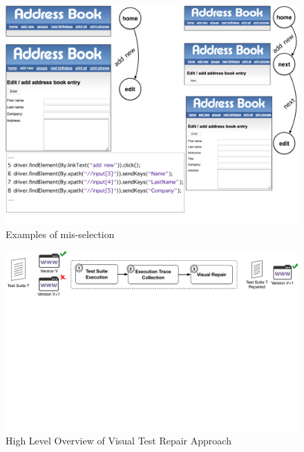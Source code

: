 \begin{figure}[t]
\centering
\includegraphics[trim={0cm 1cm 0cm 0cm},clip,scale=0.23]{images/misselection}
\caption{Examples of mis-selection}
\label{misselection}
\end{figure}

\begin{figure}[t]
\centering
\includegraphics[trim={0.0cm 18cm 0.0cm 0cm},clip,scale=0.435]{images/approach-reduced2}
\caption{High Level Overview of Visual Test Repair Approach}
\label{approach}
\end{figure}

